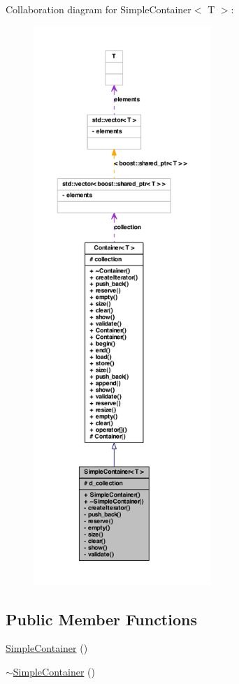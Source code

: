 Collaboration diagram for SimpleContainer$<$ T $>$:
\nopagebreak
\begin{figure}[H]
\begin{center}
\leavevmode
\includegraphics[height=600pt]{class_simple_container__coll__graph}
\end{center}
\end{figure}
\subsection*{Public Member Functions}
\begin{DoxyCompactItemize}
\item 
\hyperlink{class_simple_container_a87d087aab51b4b6aad359ad906a90e4d}{SimpleContainer} ()
\item 
\hyperlink{class_simple_container_ad0704bf9c306ab57a9c4a2b83879670c}{$\sim$SimpleContainer} ()
\end{DoxyCompactItemize}
